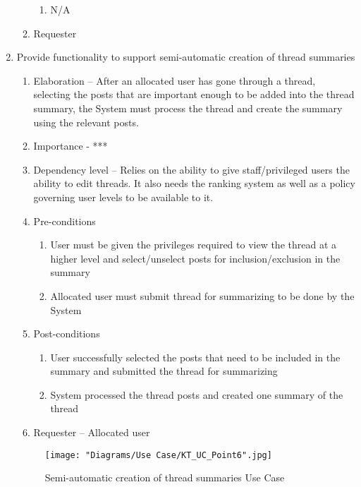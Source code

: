 \documentclass[12pt]{article}
\begin{document}
\begin{enumerate}
\begin{enumerate}
\begin{enumerate}
    	\item N/A
    \end{enumerate}
    \item Requester
  \end{enumerate}
\clearpage %
   \item  Provide functionality to support semi-automatic creation of thread summaries%
  \begin{enumerate}
    \item Elaboration – After an allocated user has gone through a thread, selecting the posts that are important enough to be added into the thread summary, the System must process the thread and create the summary using the relevant posts. 
    \item Importance - ***
    \item Dependency level – Relies on the ability to give staff/privileged users the ability to edit threads. It also needs the ranking system as well as a policy governing user levels to be available to it.
    \item Pre-conditions
    \begin{enumerate}
    	\item User must be given the privileges required to view the thread at a higher level and select/unselect posts for inclusion/exclusion in the summary
    	\item Allocated user must submit thread for summarizing to be done by the System
    \end{enumerate}
        \item Post-conditions
    \begin{enumerate}
    	\item User successfully selected the posts that need to be included in the summary and submitted the thread for summarizing
    	\item System processed the thread posts and created one summary of the thread
    \end{enumerate}
    \item Requester – Allocated user
  \end{enumerate}
\begin{figure}[h]
	\centering
	\texttt{[image: "Diagrams/Use Case/KT\_UC\_Point6".jpg]}
	\caption{Semi-automatic creation of thread summaries Use Case}
\end{figure}
\begin{figure}[h]

\end{figure}
\end{enumerate}
\end{document}
